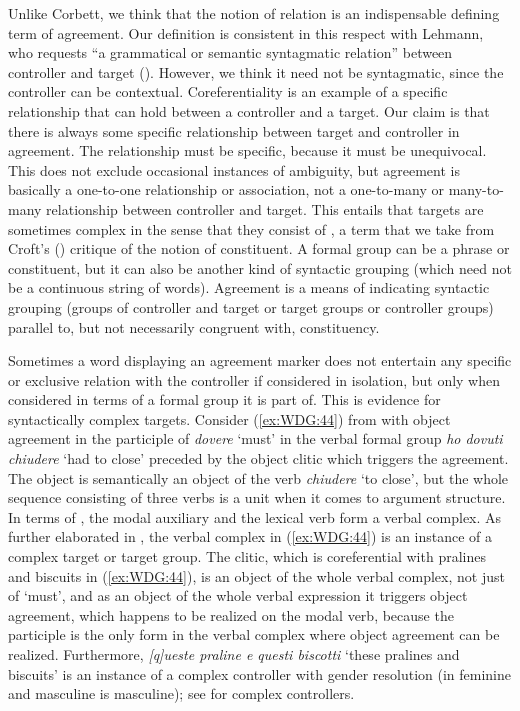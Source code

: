 \documentclass[output=collectionpaper]{langsci/langscibook}
\begin{document}
Unlike Corbett, we think that the notion of relation is an indispensable defining term of agreement. Our definition is consistent in this respect with Lehmann, who requests ``a grammatical or semantic syntagmatic relation'' between controller and target (\citealt[203]{Lehmann1982}). However, we think it need not be syntagmatic, since the controller can be contextual. Coreferentiality is an example of a specific relationship that can hold between a controller and a target. Our claim is that there is always some specific relationship between target and controller in agreement. The relationship must be specific, because it must be unequivocal. This does not exclude occasional instances of ambiguity, but agreement is basically a one-to-one relationship or association, not a one-to-many or many-to-many relationship between controller and target. This entails that targets are sometimes complex in the sense that they consist of , a term that we take from Croft's (\citealt*[190]{Croft2001}) critique of the notion of constituent. A formal group can be a phrase or constituent, but it can also be another kind of syntactic grouping (which need not be a continuous string of words). Agreement is a means of indicating syntactic grouping (groups of controller and target or target groups or controller groups) parallel to, but not necessarily congruent with, constituency.

Sometimes a word displaying an agreement marker does not entertain any specific or exclusive relation with the controller if considered in isolation, but only when considered in terms of a formal group it is part of. This is evidence for syntactically complex targets. Consider (\ref{ex:WDG:44}) from  with object agreement in the participle of \textit{dovere} `must' in the verbal formal group \textit{ho dovuti chiudere} `had to close' preceded by the object clitic which triggers the agreement. The object is semantically an object of the verb \textit{chiudere} `to close', but the whole sequence consisting of three verbs is a unit when it comes to argument structure. In terms of \cite{Rizzi1982}, the modal auxiliary and the lexical verb form a verbal complex. As further elaborated in , the verbal complex in (\ref{ex:WDG:44}) is an instance of a complex target or target group. The clitic, which is coreferential with pralines and biscuits in (\ref{ex:WDG:44}), is an object of the whole verbal complex, not just of `must', and as an object of the whole verbal expression it triggers object agreement, which happens to be realized on the modal verb, because the participle is the only form in the verbal complex where object agreement can be realized. Furthermore, \textit{[q]ueste praline e questi biscotti} `these pralines and biscuits' is an instance of a complex controller with gender resolution (in  feminine and masculine is masculine); see  for complex controllers.
\end{document}
